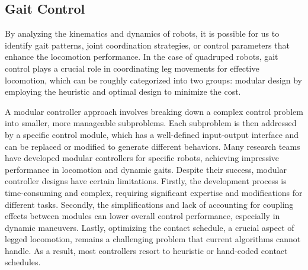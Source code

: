 \subsection{Gait Control}
By analyzing the kinematics and dynamics of robots, it is possible for us to identify gait patterns, joint coordination strategies, or control parameters that enhance the locomotion performance. In the case of quadruped robots, gait control plays a crucial role in coordinating leg movements for effective locomotion, which can be roughly categorized into two groups:  modular design by employing the heuristic and optimal design to minimize the cost. 

A modular controller approach involves breaking down a complex control problem into smaller, more manageable subproblems. Each subproblem is then addressed by a specific control module, which has a well-defined input-output interface and can be replaced or modified to generate different behaviors. Many research teams have developed modular controllers for specific robots\cite{hutterANYmalHighlyMobile2016,bledtMITCheetahDesign2018,jiOmnidirectionalWalkingQuadruped2022}, achieving impressive performance in locomotion and dynamic gaits. Despite their success, modular controller designs have certain limitations. Firstly, the development process is time-consuming and complex, requiring significant expertise and modifications for different tasks. Secondly, the simplifications and lack of accounting for coupling effects between modules can lower overall control performance, especially in dynamic maneuvers. Lastly, optimizing the contact schedule, a crucial aspect of legged locomotion, remains a challenging problem that current algorithms cannot handle. As a result, most controllers resort to heuristic or hand-coded contact schedules.

